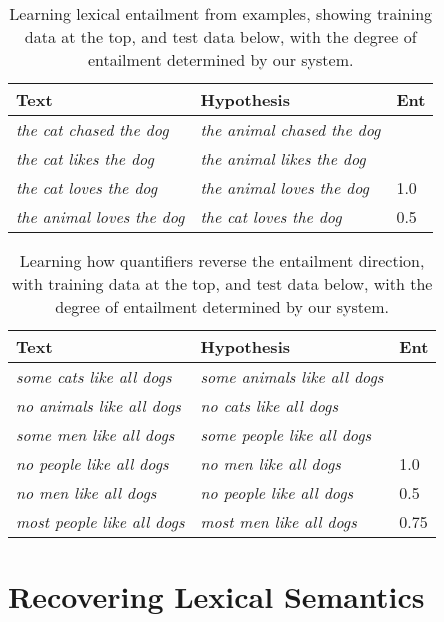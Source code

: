 \documentclass[letterpaper]{article}
\begin{document}
\begin{table*}
\centering
\begin{tabular}{|l|l|l|}
\hline
Text & Hypothesis & Ent\\
\hline
\emph{the cat chased the dog} & \emph{the animal chased the dog} & \\
\emph{the cat likes the dog} & \emph{the animal likes the dog} & \\
\hline
\emph{the cat loves the dog} & \emph{the animal loves the dog} & 1.0\\
\emph{the animal loves the dog} & \emph{the cat loves the dog} & 0.5\\
\hline
\end{tabular}
\caption{Learning lexical entailment from examples, showing training
  data at the top, and test data below, with the degree of entailment
  determined by our system.}
\label{table:lexical}
\end{table*}

\begin{table*}
\centering
\begin{tabular}{|l|l|l|}
\hline
Text & Hypothesis & Ent\\
\hline
\emph{some cats like all dogs} & \emph{some animals like all dogs} & \\
\emph{no animals like all dogs} & \emph{no cats like all dogs} & \\
\emph{some men like all dogs} & \emph{some people like all dogs} & \\
\hline
\emph{no people like all dogs} & \emph{no men like all dogs} & 1.0\\
\emph{no men like all dogs} & \emph{no people like all dogs} & 0.5\\
\emph{most people like all dogs} & \emph{most men like all dogs} & 0.75\\
\hline
\end{tabular}
\caption{Learning how quantifiers reverse the entailment direction,
  with training data at the top, and test data below, with the degree
  of entailment determined by our system.}
\label{table:quantifiers}
\end{table*}

\begin{table}
\centering
{}
\caption{Learnt probabilities for the nouns in the example
  in Table \ref{table:quantifiers}}
\label{table:lexical}
\end{table}

\section{Recovering Lexical Semantics}
\label{sec:recovering}
\end{document}
